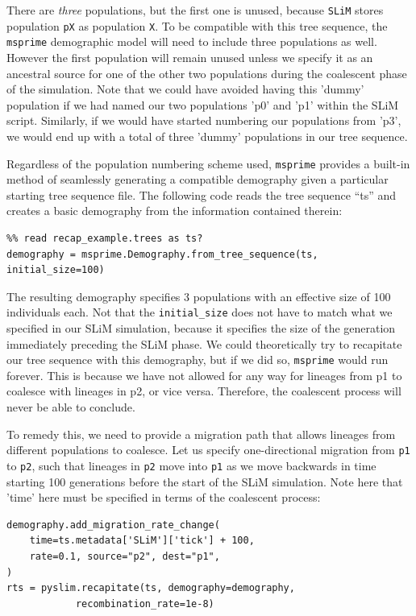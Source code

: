 \documentclass[12pt]{article}
\newcommand{\msprime}[0]{\texttt{msprime}\xspace}
\newcommand{\slim}[0]{\texttt{SLiM}\xspace}
\newcommand{\p}[1]{\texttt{p#1}}
\begin{document}
There are \emph{three} populations, but the first one is unused, because \slim stores population \texttt{pX} as population \texttt{X}.
To be compatible with this tree sequence, the \msprime demographic model will need to include three populations as well.
However the first population will remain unused unless we specify it as an ancestral source for
one of the other two populations during the coalescent phase of the simulation. Note that we could have avoided having this
'dummy' population if we had named our two populations 'p0' and 'p1' within the SLiM script. Similarly, if we would have started
numbering our populations from 'p3', we would end up with a total of three 'dummy' populations in our tree sequence.

Regardless of the population numbering scheme used, \msprime provides a built-in method of seamlessly generating a
compatible demography given a particular starting tree sequence file. The following code reads the tree sequence ``ts''
and creates a basic demography from the information contained therein: 
\begin{verbatim}
%% read recap_example.trees as ts?
demography = msprime.Demography.from_tree_sequence(ts, initial_size=100)
\end{verbatim}

The resulting demography specifies 3 populations with an effective size of 100 individuals each. Not that the \verb|initial_size|
does not have to match what we specified in our SLiM simulation, because it specifies the size of the generation
immediately preceding the SLiM phase. We could theoretically try to recapitate our tree sequence with this
demography, but if we did so, \msprime would run forever. This is because we have not allowed for any way for
lineages from p1 to coalesce with lineages in p2, or vice versa. Therefore, the coalescent process will never be able to conclude.

To remedy this, we need to provide a migration path that allows lineages from different populations to coalesce.
Let us specify one-directional migration from \p1 to \p2, such that lineages in \p2 move into \p1 as we move backwards in time
starting 100 generations before the start of the SLiM simulation. Note here that 'time' here must be specified in terms of the coalescent process:
\begin{verbatim}
demography.add_migration_rate_change(
    time=ts.metadata['SLiM']['tick'] + 100,
    rate=0.1, source="p2", dest="p1",
)
rts = pyslim.recapitate(ts, demography=demography,
            recombination_rate=1e-8)
\end{verbatim}
\end{document}
